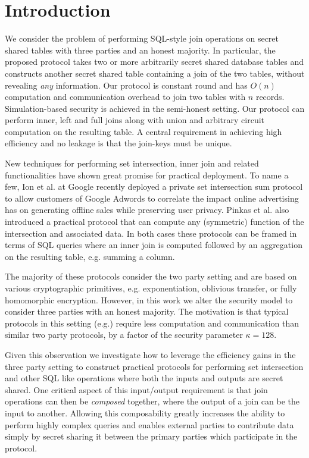 \section{Introduction}

We consider the problem of performing SQL-style join operations on secret shared tables with three parties and an honest majority. In particular, the proposed protocol takes two or more arbitrarily secret shared database tables and constructs another secret shared table containing a join of the two tables, without revealing \emph{any}  information. Our protocol is constant round and  has $O(n)$ computation and communication  overhead to join two tables with $n$ records. Simulation-based security is achieved in the semi-honest setting. Our protocol can perform inner, left and full joins along with union and arbitrary circuit computation on the resulting table. A central requirement in achieving high efficiency and no leakage is that the join-keys must be unique. 

New techniques \cite{usenix:PSZ14,USENIX:PSSZ15,PSZ16,CCS:KKRT16,PSWW18,CLR17,CHLR18,cryptoeprint:2017:738,RA17,KLSAP17,OOS17,KMPRT17} for performing set intersection, inner join and related functionalities have shown great promise for practical deployment. To name a few, Ion et al. at Google recently deployed a private set intersection sum protocol\cite{cryptoeprint:2017:738} to allow customers of Google Adwords to correlate the impact online advertising has on generating offline sales while preserving user privacy. Pinkas et al. \cite{PSWW18} also introduced a practical protocol that can compute any (symmetric) function of the intersection and associated data. In both cases these protocols can be framed in terms of SQL queries where an inner join is computed followed by an aggregation on the resulting table, e.g. summing a column.  

The majority of these protocols consider the two party setting and are based on various cryptographic primitives, e.g. exponentiation\cite{cryptoeprint:2017:738}, oblivious transfer\cite{PSWW18}, or fully homomorphic encryption\cite{CLR17}. However, in this work we alter the security model to consider three parties with an honest majority. The motivation is that typical protocols in this setting (e.g.\cite{highthroughput}) require less computation and communication than similar two party protocols, by a factor of the security parameter $\kappa=128$.

Given this observation we investigate how to leverage the efficiency gains in the three party setting to construct practical protocols for performing set intersection and other SQL like operations where both the inputs and outputs are secret shared. One critical aspect of this input/output requirement is that join operations can then be \emph{composed} together, where the output of a join can be the input to another. Allowing this composability greatly increases the ability to perform highly complex queries and enables external parties to contribute data simply by secret sharing it between the primary parties which participate in the protocol.

